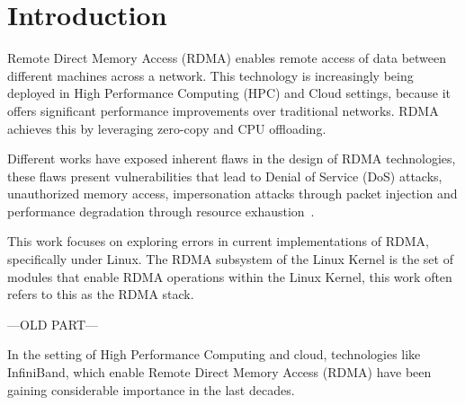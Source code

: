 \section{Introduction}





Remote Direct Memory Access (RDMA) enables remote access of data between different machines across a network.
This technology is increasingly being deployed in High Performance Computing (HPC) and Cloud settings, because
it offers significant performance improvements over traditional networks. RDMA achieves this by
leveraging zero-copy and CPU offloading.


Different works have exposed inherent flaws in the design of RDMA technologies, these flaws present
vulnerabilities that lead to Denial of Service (DoS) attacks, unauthorized memory access, impersonation
attacks through packet injection and performance degradation through resource exhaustion~\cite{rothenbergerReDMArkBypassingRDMA2021}\cite{tsaiDoubleEdgedSwordSecurity2019}.


This work focuses on exploring errors in current implementations of RDMA, specifically under Linux.
The RDMA subsystem of the Linux Kernel is the set of modules that enable RDMA operations within the Linux Kernel,
this work often refers to this as the RDMA stack.









---OLD PART---



In the setting of High Performance Computing and cloud, technologies like InfiniBand, which enable Remote Direct Memory Access
(RDMA) have been gaining considerable importance in the last decades.

